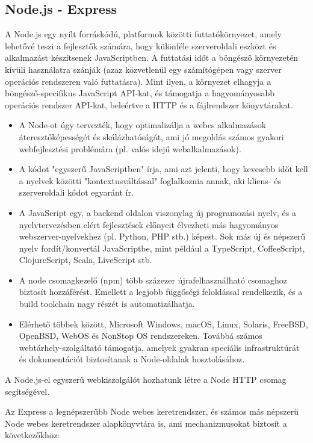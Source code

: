 \subsection{Node.js - Express}
A Node.js egy nyílt forráskódú, platformok közötti futtatókörnyezet, amely lehetővé teszi a fejlesztők számára, hogy különféle szerveroldali eszközt és alkalmazást készítsenek JavaScriptben. A futtatási időt a böngésző környezetén kívüli használatra szánják (azaz közvetlenül egy számítógépen vagy szerver operációs rendszeren való futtatásra). Mint ilyen, a környezet elhagyja a böngésző-specifikus JavaScript API-kat, és támogatja a hagyományosabb operációs rendszer API-kat, beleértve a HTTP és a fájlrendszer könyvtárakat.
 
\begin{itemize}
\item A Node-ot úgy tervezték, hogy optimalizálja a webes alkalmazások áteresztőképességét és skálázhatóságát, ami jó megoldás számos gyakori webfejlesztési problémára (pl. valós idejű webalkalmazások).
\item A kódot "egyszerű JavaScriptben" írja, ami azt jelenti, hogy kevesebb időt kell a nyelvek közötti "kontextusváltással" foglalkoznia annak, aki kliens- és szerveroldali kódot egyaránt ír.
\item A JavaScript egy, a backend oldalon viszonylag új programozási nyelv, és a nyelvtervezésben elért fejlesztések előnyeit élvezheti más hagyományos webszerver-nyelvekhez (pl. Python, PHP stb.) képest. Sok más új és népszerű nyelv fordít/konvertál JavaScriptbe, mint például a TypeScript, CoffeeScript, ClojureScript, Scala, LiveScript stb.
\item  A node csomagkezelő (npm) több százezer újrafelhasználható csomaghoz biztosít hozzáférést. Emellett a legjobb függőségi feloldással rendelkezik, és a build toolchain nagy részét is automatizálhatja.
\item Elérhető többek között, Microsoft Windows, macOS, Linux, Solaris, FreeBSD, OpenBSD, WebOS és NonStop OS rendszereken. Továbbá számos webtárhely-szolgáltató támogatja, amelyek gyakran speciális infrastruktúrát és dokumentációt biztosítanak a Node-oldalak hosztolásához.
\end{itemize}

A Node.js-el egyszerű webkiszolgálót hozhatunk létre a Node HTTP csomag segítségével.\newline

Az Express a legnépszerűbb Node webes keretrendszer, és számos más népszerű Node webes keretrendszer alapkönyvtára is, ami mechanizmusokat biztosít a következőkhöz:

